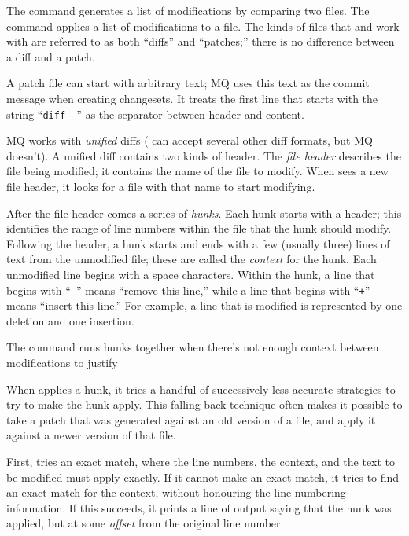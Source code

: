 The  command generates a list of modifications by
comparing two files.  The  command applies a list of
modifications to a file.  The kinds of files that  and
 work with are referred to as both ``diffs'' and
``patches;'' there is no difference between a diff and a patch.

A patch file can start with arbitrary text; MQ uses this text as the
commit message when creating changesets.  It treats the first line
that starts with the string ``\texttt{diff~-}'' as the separator
between header and content.

MQ works with \emph{unified} diffs ( can accept several
other diff formats, but MQ doesn't).  A unified diff contains two
kinds of header.  The \emph{file header} describes the file being
modified; it contains the name of the file to modify.  When
 sees a new file header, it looks for a file with that
name to start modifying.

After the file header comes a series of \emph{hunks}.  Each hunk
starts with a header; this identifies the range of line numbers within
the file that the hunk should modify.  Following the header, a hunk
starts and ends with a few (usually three) lines of text from the
unmodified file; these are called the \emph{context} for the hunk.
Each unmodified line begins with a space characters.  Within the hunk,
a line that begins with ``\texttt{-}'' means ``remove this line,''
while a line that begins with ``\texttt{+}'' means ``insert this
line.''  For example, a line that is modified is represented by one
deletion and one insertion.

The  command runs hunks together when there's not enough
context between modifications to justify

When  applies a hunk, it tries a handful of
successively less accurate strategies to try to make the hunk apply.
This falling-back technique often makes it possible to take a patch
that was generated against an old version of a file, and apply it
against a newer version of that file.

First,  tries an exact match, where the line numbers,
the context, and the text to be modified must apply exactly.  If it
cannot make an exact match, it tries to find an exact match for the
context, without honouring the line numbering information.  If this
succeeds, it prints a line of output saying that the hunk was applied,
but at some \emph{offset} from the original line number.

